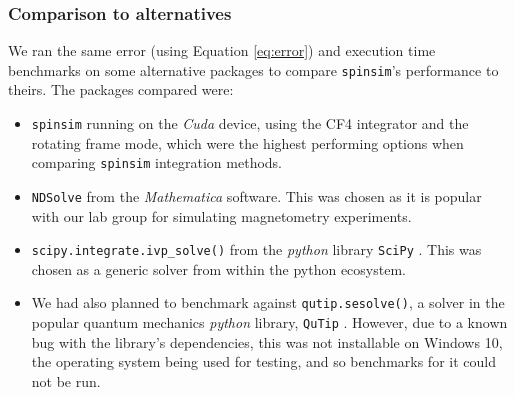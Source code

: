 \documentclass{jors}
\begin{document}



		\subsubsection*{Comparison to alternatives}
			We ran the same error (using Equation \eqref{eq:error}) and execution time benchmarks on some alternative packages to compare \texttt{spinsim}'s performance to theirs. The packages compared were:
			\begin{itemize}
				\item \texttt{spinsim} running on the \emph{Cuda} device, using the CF4 integrator and the rotating frame mode, which were the highest performing options when comparing \texttt{spinsim} integration methods.
				\item \texttt{NDSolve} from the \emph{Mathematica} \cite{wolfram_research_inc_mathematica_2020} software. This was chosen as it is popular with our lab group for simulating magnetometry experiments.
				\item \texttt{scipy.integrate.ivp\_solve()} from the \emph{python} library \texttt{SciPy} \cite{virtanen_scipy_2020}. This was chosen as a generic solver from within the python ecosystem.
				\item We had also planned to benchmark against \texttt{qutip.sesolve()}, a solver in the popular quantum mechanics \emph{python} library, \texttt{QuTip} \cite{johansson_qutip_2013}. However, due to a known bug with the library’s dependencies, this was not installable on Windows 10, the operating system being used for testing, and so benchmarks for it could not be run.
			\end{itemize}
\end{document}
